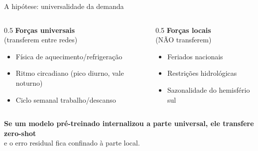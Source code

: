 \documentclass[aspectratio=169,10pt]{beamer}
\newcommand{\hl}[1]{\textcolor{hl}{\textbf{#1}}}
\begin{document}
\begin{frame}{A hipótese: universalidade da demanda}
  \begin{columns}[T]
    \begin{column}{0.5\textwidth}
      \textbf{Forças universais} \\(transferem entre redes)
      \begin{itemize}
        \item Física de aquecimento/refrigeração
        \item Ritmo circadiano (pico diurno, vale noturno)
        \item Ciclo semanal trabalho/descanso
      \end{itemize}
    \end{column}
    \begin{column}{0.5\textwidth}
      \textbf{Forças locais} \\(NÃO transferem)
      \begin{itemize}
        \item Feriados nacionais
        \item Restrições hidrológicas
        \item Sazonalidade do hemisfério sul
      \end{itemize}
    \end{column}
  \end{columns}
  \vspace{1em}
  \begin{center}
    \hl{Se um modelo pré-treinado internalizou a parte universal, ele transfere zero-shot}\\
    e o erro residual fica confinado à parte local.
  \end{center}
\end{frame}
\end{document}
